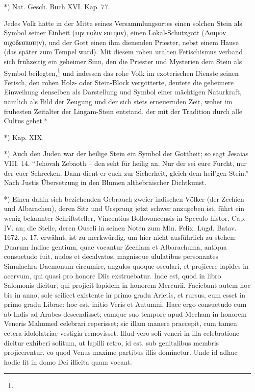 \documentclass[a4paper, 11pt, oneside, polutonikogreek, german]{article}
\begin{document}
*) Nat. Gesch. Buch XVI. Kap. 77.

Jedes Volk hatte in der Mitte seines Versammlungsortes einen solchen Stein als Symbol seiner Einheit (την πολιν εστηαν), einen Lokal-Schutzgott (Δαιμον οιχοδεσποτην), und der Gott einen ihm dienenden Priester, nebst einem Hause (das später zum Tempel ward). Mit diesem rohen uralten Fetischismus verband sich frühzeitig ein geheimer Sinn, den die Priester und Mysterien dem Stein als Symbol beilegten,\footnote{} und indessen das rohe Volk im exoterischen Dienste seinen Fetisch, den rohen Holz- oder Stein-Block vergötterte, deutete die geheimere Einweihung denselben als Darstellung und Symbol einer mächtigen Naturkraft, nämlich als Bild der Zeugung und der sich stets erneuernden Zeit, woher im frühesten Zeitalter der Lingam-Stein entstand, der mit der Tradition durch alle Cultus gehet.*

*) Kap. XIX.

*) Auch den Juden war der heilige Stein ein Symbol der Gottheit; so sagt Jesaias VIII. 14. "`Jehovah Zebaoth -- den seht für heilig an,
Nur der sei eure Furcht, nur der euer
Schrecken,
Dann dient er euch zur Sicherheit, gleich
dem heil'gen Stein."'
Nach Justis Übersetzung in den Blumen althebräischer Dichtkunst.

*) Einen dahin sich beziehenden Gebrauch zweier indischen Völker (der Zechien und Albarachen), deren Sitz und Ursprung jetzt schwer anzugeben ist, führt ein wenig bekannter Schriftsteller, Vincentius Bollovancensis in Speculo histor. Cap. IV. an; die Stelle, deren Ouseli in seinen Noten zum Min. Felix. Lugd. Batav. 1672. p. 17. erwähnt, ist zu merkwürdig, um hier nicht ausführlich zu stehen:
Duarum Indiae gentium, quae vocantur Zechiam et Albarachuma, antiqua consuetudo fuit, nudos et decalvatos, magnisque ululatibus personantes Simulachra Daemonum circumire, angulos quoque osculari, et projicere lapides in acervum, qui quasi pro honore Diis exstruebatur. Inde est, quod in libro Salomonis dicitur; qui projicit lapidem in honorem Mercurii. Faciebant autem hoc bis in anno, sole scilicet existente in primo gradu Arietis, et rursus, cum esset in primo gradu Librae: hoc est, initio Veris et Autumni. Haec ergo consuetudo cum ab Indis ad Arabes descendisset; eamque suo tempore apud Mecham in honorem Veneris Mahumed celebrari reperisset; sic illam manere praecepit, cum tamen cetera idololatriae vestigia removisset. Illud vero soli veneri in illa celebratione dicitur exhiberi solitum, ut lapilli retro, id est, sub genitalibus membris projicerentur, eo quod Venus maxime partibus illis dominetur. Unde id adhuc hodie fit in domo Dei illicita quam vocant.
\end{document}
